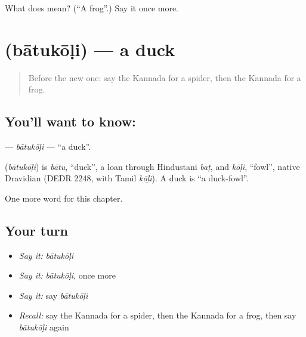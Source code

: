 \begin{tcolorbox}[breakable,colback=teal!4,colframe=teal!35!black,title={Before you move on}]
What does  mean? (\textquotedblleft{}A frog\textquotedblright{}.) Say it once more.
\end{tcolorbox}
\section[\texorpdfstring{\kn{ಬಾತುಕೋಳಿ} (bātukōḷi)}{ಬಾತುಕೋಳಿ (bātukōḷi)}]{ (bātukōḷi) — a duck}

\label{lesson:KA-C133-batukoli}



\begin{quote}
Before the new one: say the Kannada for a spider, then the Kannada for a frog.
\end{quote}

\subsection*{You'll want to know: }
\textbf{} — \emph{bātukōḷi} — \textquotedblleft{}a duck\textquotedblright{}.

\begin{cousinweb}
\textbf{} (\emph{bātukōḷi}) is \emph{bātu}, \textquotedblleft{}duck\textquotedblright{}, a loan through Hindustani \emph{baṭ}, and \emph{kōḷi}, \textquotedblleft{}fowl\textquotedblright{}, native Dravidian (DEDR 2248, with Tamil \emph{kōḻi}). A duck is \textquotedblleft{}a duck-fowl\textquotedblright{}.
\end{cousinweb}

\begin{grammarlens}[title={What you've built}]
One more word for this chapter.
\end{grammarlens}

\subsection*{Your turn}
\begin{itemize}
\raggedright
  \item \emph{Say it:} \emph{bātukōḷi}
  \item \emph{Say it:} \emph{bātukōḷi}, once more
  \item \emph{Say it:} say \emph{bātukōḷi}
  \item \emph{Recall:} say the Kannada for a spider, then the Kannada for a frog, then say \emph{bātukōḷi} again
\end{itemize}

